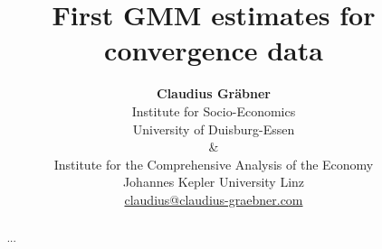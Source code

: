 \title{
  First GMM estimates for convergence data}

\author{
  \textbf{Claudius Gräbner} \\
  Institute for Socio-Economics\\
  University of Duisburg-Essen\\
  \& \\
  Institute for the Comprehensive Analysis of the Economy\\
  Johannes Kepler University Linz\\
  \href{mailto:claudius@claudius-graebner.com}{claudius@claudius-graebner.com} \\
}
\maketitle

\begin{abstract}
\small
...
\end{abstract}

\newpage
\tableofcontents
{}
\setcounter{page}{1}
